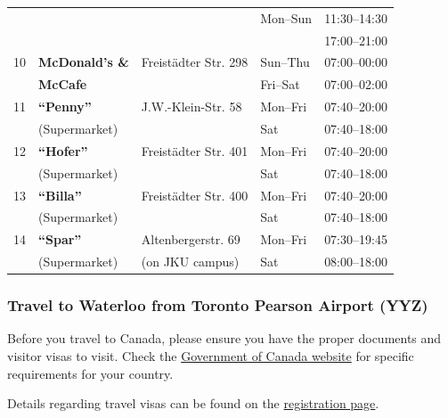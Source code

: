\begin{center}
\begin{footnotesize}
\begin{longtable}{|| l || l | l | l l||}
     &                            &  & Mon--Sun & 11:30--14:30\\
     &                            &  &  & 17:00--21:00\\ \hline
 10  & \textbf{McDonald's \&} & Freist\"{a}dter Str. 298 & Sun--Thu & 07:00--00:00 \\
     & \textbf{McCafe} &               &  Fri--Sat & 07:00--02:00 \\ \hline
 11  & \textbf{``Penny''} & J.W.-Klein-Str. 58 & Mon--Fri & 07:40--20:00 \\
     & (Supermarket)      &                    & Sat      & 07:40--18:00 \\ \hline 
 12  & \textbf{``Hofer''} & Freist\"{a}dter Str. 401 & Mon--Fri & 07:40--20:00 \\
     & (Supermarket)      &                    & Sat      & 07:40--18:00 \\ \hline 
 13  & \textbf{``Billa''} & Freist\"{a}dter Str. 400 & Mon--Fri & 07:40--20:00 \\
     & (Supermarket)      &                    & Sat      & 07:40--18:00 \\ \hline      
 14  & \textbf{``Spar''} & Altenbergerstr. 69 & Mon--Fri & 07:30--19:45 \\
     & (Supermarket)      &  (on JKU campus)  & Sat      & 08:00--18:00 \\ \hline  
\hline   
\end{longtable}
\end{footnotesize}
\end{center}
\fi





\subsubsection{Travel to Waterloo from Toronto Pearson Airport (YYZ)}

Before you travel to Canada, please ensure you have the proper documents and visitor visas to visit. Check the \href{https://www.canada.ca/en/immigration-refugees-citizenship/services/visit-canada.html?outside}{Government of Canada website} for specific requirements for your country.

Details regarding travel visas can be found on the \href{https://uwaterloo.ca/monte-carlo-methods-scientific-computing-conference/registration}{registration page}.

